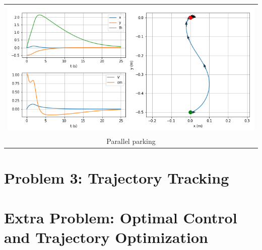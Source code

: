 \documentclass{article}
\begin{document}
\begin{enumerate}[label=(\roman*)]
	\begin{tabular}[t]{c}
		\hline \\
		\includegraphics[width=1.0\textwidth]{img/sim_parking_parallel.png} \\
		Parallel parking \\
		\hline
	\end{tabular}
		
	\end{enumerate}


\section*{Problem 3: Trajectory Tracking}

\section*{Extra Problem: Optimal Control and Trajectory Optimization}
\end{document}
